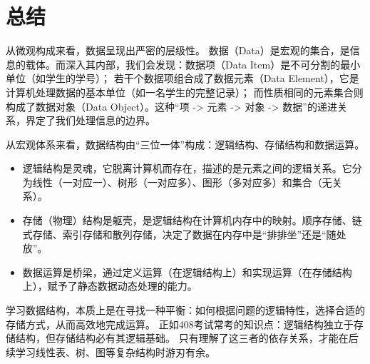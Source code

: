 \documentclass[b5paper,11pt]{article}
\begin{document}
\section{总结}
从微观构成来看，数据呈现出严密的层级性。
数据（Data）是宏观的集合，是信息的载体。而深入其内部，我们会发现：数据项（Data Item）是不可分割的最小单位（如学生的学号）；
若干个数据项组合成了数据元素（Data Element），它是计算机处理数据的基本单位（如一名学生的完整记录）；
而性质相同的元素集合则构成了数据对象（Data Object）。这种“项 -> 元素 -> 对象 -> 数据”的递进关系，界定了我们处理信息的边界。

从宏观体系来看，数据结构由“三位一体”构成：逻辑结构、存储结构和数据运算。
\begin{itemize}
  \item 逻辑结构是灵魂，它脱离计算机而存在，描述的是元素之间的逻辑关系。它分为线性（一对应一）、树形（一对应多）、图形（多对应多）和集合（无关系）。
  \item 存储（物理）结构是躯壳，是逻辑结构在计算机内存中的映射。顺序存储、链式存储、索引存储和散列存储，决定了数据在内存中是“排排坐”还是“随处放”。
  \item 数据运算是桥梁，通过定义运算（在逻辑结构上）和实现运算（在存储结构上），赋予了静态数据动态处理的能力。
\end{itemize}

学习数据结构，本质上是在寻找一种平衡：如何根据问题的逻辑特性，选择合适的存储方式，从而高效地完成运算。
正如408考试常考的知识点：逻辑结构独立于存储结构，但存储结构必有其逻辑基础。
只有理解了这三者的依存关系，才能在后续学习线性表、树、图等复杂结构时游刃有余。
\end{document}
